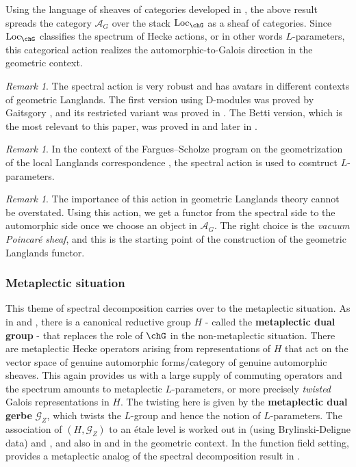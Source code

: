 \documentclass[10pt]{amsart}
\newcommand{\sssec}{\subsubsection}
\theoremstyle{remark}
\newtheorem{rmk}[subsubsection]{Remark}
\newcommand{\on}{\operatorname}
\newcommand{\cA}{\mathcal{A}}
\newcommand{\cG}{\mathcal{G}}
\newcommand{\Loc}{\on{Loc}}
\begin{document}
Using the language of sheaves of categories developed in \cite{Ga}, the above result spreads the category $\cA_G$ over the stack $\Loc_{\chG}$ as a sheaf of categories. Since $\Loc_{\chG}$ classifies the spectrum of Hecke actions, or in other words $L$-parameters, this categorical action realizes the automorphic-to-Galois direction in the geometric context.

\begin{rmk}
The spectral action is very robust and has avatars in different contexts of geometric Langlands. The first version using D-modules was proved by Gaitsgory \cite{Gai1}, and its restricted variant was proved in \cite{AGKRRV}. The Betti version, which is the most relevant to this paper, was proved in \cite{NY} and later in \cite{GKRV}.
\end{rmk}

\begin{rmk}
    In the context of the Fargues--Scholze program on the geometrization of the local Langlands correspondence \cite{FS}, the spectral action is used to cosntruct $L$-parameters.
\end{rmk}

\begin{rmk}
 The importance of this action in geometric Langlands theory cannot be overstated. Using this action, we get a functor from the spectral side to the automorphic side once we choose an object in $\cA_G$. The right choice is the \emph{vacuum Poincar\'e sheaf}, and this is the starting point of the construction of the geometric Langlands functor.
\end{rmk}


\sssec{Metaplectic situation}
This theme of spectral decomposition carries over to the metaplectic situation. As in \cite{Wei} and \cite{Zhao1}, there is a canonical reductive group $H$ - called the \textbf{metaplectic dual group} - that replaces the role of $\chG$ in the non-metaplectic situation. There are metaplectic Hecke operators arising from representations of $H$ that act on the vector space of genuine automorphic forms/category of genuine automorphic sheaves. This again provides us with a large supply of commuting operators and the spectrum amounts to metaplectic $L$-parameters, or more precisely \emph{twisted} Galois representations in $H$. The twisting here is given by the \textbf{metaplectic dual gerbe} $\cG_Z$, which twists the $L$-group and hence the notion of $L$-parameters. The association of $(H,\cG_Z)$ to an \'etale level is worked out in \cite{Wei} (using Brylinski-Deligne data) and \cite{Zhao1}, and also in \cite{Rei} and \cite{GL} in the geometric context.
In the function field setting, \cite{ZhaoNew} provides a metaplectic analog of the spectral decomposition result in \cite{Laf}. 
\medskip
\end{document}
